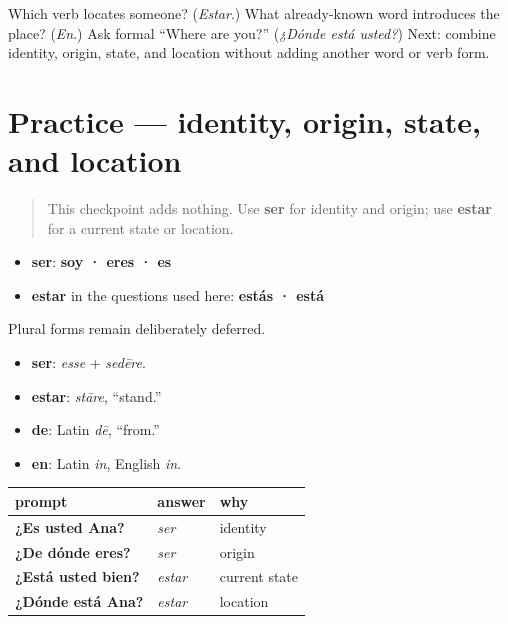 \begin{tcolorbox}[breakable,colback=teal!4,colframe=teal!35!black,title={Before you move on}]
Which verb locates someone? (\emph{Estar}.) What already-known word introduces the place? (\emph{En}.) Ask formal “Where are you?” (\emph{¿Dónde está usted?}) Next: combine identity, origin, state, and location without adding another word or verb form.
\end{tcolorbox}
\section[Practice]{Practice — identity, origin, state, and location}

\label{lesson:ES-C09-practice}



\begin{quote}
This checkpoint adds nothing. Use \textbf{ser} for identity and origin; use \textbf{estar} for a current state or location.
\end{quote}

\begin{grammarlens}[title={Grammar Lens: retrieve the two small form sets}]
\begin{itemize}
\raggedright
  \item \textbf{ser}: \textbf{soy · eres · es}
  \item \textbf{estar} in the questions used here: \textbf{estás · está}
\end{itemize}

Plural forms remain deliberately deferred.
\end{grammarlens}

\begin{cousinweb}
\begin{itemize}
\raggedright
  \item \textbf{ser}: \emph{esse} + \emph{sedēre}.
  \item \textbf{estar}: \emph{stāre}, “stand.”
  \item \textbf{de}: Latin \emph{dē}, “from.”
  \item \textbf{en}: Latin \emph{in}, English \emph{in}.
\end{itemize}
\end{cousinweb}

\begin{grammarlens}[title={Grammar Lens: sort by the kind of claim}]
\noindent
\begin{tabularx}{\linewidth}{@{}>{\raggedright\arraybackslash}X>{\raggedright\arraybackslash}X>{\raggedright\arraybackslash}X@{}}
\toprule
\textbf{prompt} & \textbf{answer} & \textbf{why} \\
\midrule
\textbf{¿Es usted Ana?} & \emph{ser} & identity \\
\textbf{¿De dónde eres?} & \emph{ser} & origin \\
\textbf{¿Está usted bien?} & \emph{estar} & current state \\
\textbf{¿Dónde está Ana?} & \emph{estar} & location \\
\bottomrule
\end{tabularx}
\end{grammarlens}

